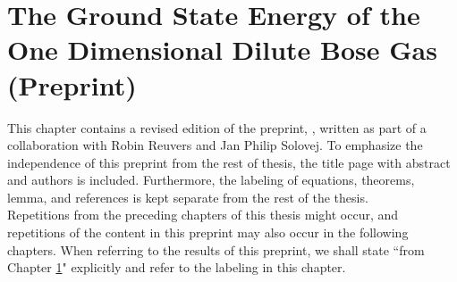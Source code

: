 \chapter{The Ground State Energy of the One Dimensional Dilute Bose Gas (Preprint)}\label{ChapterTheGroundStateEnergyOfTheOneDimensionalDiluteBoseGas}
This chapter contains a revised edition of the preprint, \cite{agerskov2022ground}, written as part of a collaboration with Robin Reuvers and Jan Philip Solovej. To emphasize the independence of this preprint from the rest of thesis, the title page with abstract and authors is included. Furthermore, the labeling of equations, theorems, lemma, and references is kept separate from the rest of the thesis.\\
Repetitions from the preceding chapters of this thesis might occur, and repetitions of the content in this preprint may also occur in the following chapters. When referring to the results of this preprint, we shall state ``from Chapter \ref{ChapterTheGroundStateEnergyOfTheOneDimensionalDiluteBoseGas}" explicitly and refer to the labeling in this chapter.

%

